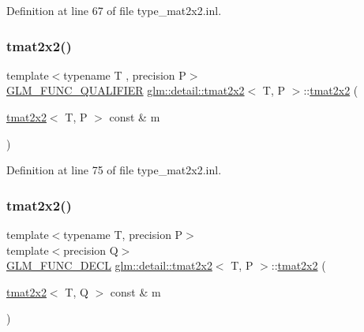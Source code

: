 Definition at line 67 of file type\+\_\+mat2x2.\+inl.

\mbox{\label{structglm_1_1detail_1_1tmat2x2_ace6c970e91f6eace80227602531e4d8a}} 
\subsubsection{\texorpdfstring{tmat2x2()}{tmat2x2()}\hspace{0.1cm}{\footnotesize\ttfamily [2/22]}}
{\footnotesize\ttfamily template$<$typename T , precision P$>$ \\
\hyperlink{setup_8hpp_a33fdea6f91c5f834105f7415e2a64407}{G\+L\+M\+\_\+\+F\+U\+N\+C\+\_\+\+Q\+U\+A\+L\+I\+F\+I\+ER} \hyperlink{structglm_1_1detail_1_1tmat2x2}{glm\+::detail\+::tmat2x2}$<$ T, P $>$\+::\hyperlink{structglm_1_1detail_1_1tmat2x2}{tmat2x2} (\begin{DoxyParamCaption}\item[{\hyperlink{structglm_1_1detail_1_1tmat2x2}{tmat2x2}$<$ T, P $>$ const \&}]{m }\end{DoxyParamCaption})}



Definition at line 75 of file type\+\_\+mat2x2.\+inl.

\mbox{\label{structglm_1_1detail_1_1tmat2x2_a0273bde43902469715fd10c0fd06cac4}} 
\subsubsection{\texorpdfstring{tmat2x2()}{tmat2x2()}\hspace{0.1cm}{\footnotesize\ttfamily [3/22]}}
{\footnotesize\ttfamily template$<$typename T, precision P$>$ \\
template$<$precision Q$>$ \\
\hyperlink{setup_8hpp_ab2d052de21a70539923e9bcbf6e83a51}{G\+L\+M\+\_\+\+F\+U\+N\+C\+\_\+\+D\+E\+CL} \hyperlink{structglm_1_1detail_1_1tmat2x2}{glm\+::detail\+::tmat2x2}$<$ T, P $>$\+::\hyperlink{structglm_1_1detail_1_1tmat2x2}{tmat2x2} (\begin{DoxyParamCaption}\item[{\hyperlink{structglm_1_1detail_1_1tmat2x2}{tmat2x2}$<$ T, Q $>$ const \&}]{m }\end{DoxyParamCaption})}

